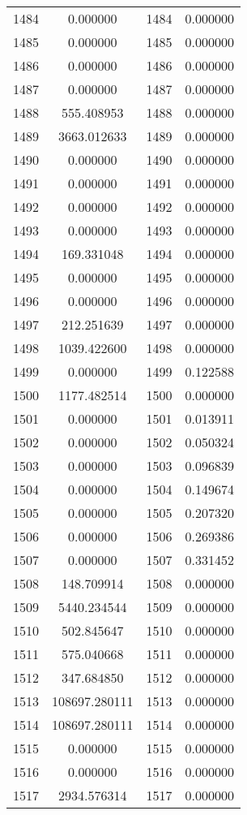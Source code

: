 \documentclass[12pt]{article}
\begin{document}
\begin{longtable}{@{}cccc@{}}
1484 & 0.000000 & 1484 & 0.000000 \\
1485 & 0.000000 & 1485 & 0.000000 \\
1486 & 0.000000 & 1486 & 0.000000 \\
1487 & 0.000000 & 1487 & 0.000000 \\
1488 & 555.408953 & 1488 & 0.000000 \\
1489 & 3663.012633 & 1489 & 0.000000 \\
1490 & 0.000000 & 1490 & 0.000000 \\
1491 & 0.000000 & 1491 & 0.000000 \\
1492 & 0.000000 & 1492 & 0.000000 \\
1493 & 0.000000 & 1493 & 0.000000 \\
1494 & 169.331048 & 1494 & 0.000000 \\
1495 & 0.000000 & 1495 & 0.000000 \\
1496 & 0.000000 & 1496 & 0.000000 \\
1497 & 212.251639 & 1497 & 0.000000 \\
1498 & 1039.422600 & 1498 & 0.000000 \\
1499 & 0.000000 & 1499 & 0.122588 \\
1500 & 1177.482514 & 1500 & 0.000000 \\
1501 & 0.000000 & 1501 & 0.013911 \\
1502 & 0.000000 & 1502 & 0.050324 \\
1503 & 0.000000 & 1503 & 0.096839 \\
1504 & 0.000000 & 1504 & 0.149674 \\
1505 & 0.000000 & 1505 & 0.207320 \\
1506 & 0.000000 & 1506 & 0.269386 \\
1507 & 0.000000 & 1507 & 0.331452 \\
1508 & 148.709914 & 1508 & 0.000000 \\
1509 & 5440.234544 & 1509 & 0.000000 \\
1510 & 502.845647 & 1510 & 0.000000 \\
1511 & 575.040668 & 1511 & 0.000000 \\
1512 & 347.684850 & 1512 & 0.000000 \\
1513 & 108697.280111 & 1513 & 0.000000 \\
1514 & 108697.280111 & 1514 & 0.000000 \\
1515 & 0.000000 & 1515 & 0.000000 \\
1516 & 0.000000 & 1516 & 0.000000 \\
1517 & 2934.576314 & 1517 & 0.000000 \\

\end{longtable}
\end{document}
